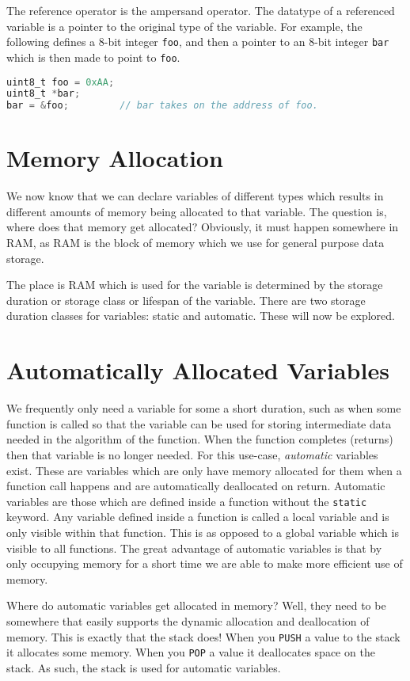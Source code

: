 The reference operator is the ampersand operator. The datatype of a referenced variable is a pointer to the original type of the variable.
For example, the following defines a 8-bit integer \texttt{foo}, and then a pointer to an 8-bit integer \texttt{bar} which is then made to point to \texttt{foo}.

\begin{lstlisting}[language=C]
uint8_t foo = 0xAA;
uint8_t *bar;
bar = &foo;         // bar takes on the address of foo.
\end{lstlisting}

\section{Memory Allocation}
We now know that we can declare variables of different types which results in different amounts of memory being allocated to that variable. 
The question is, where does that memory get allocated?
Obviously, it must happen somewhere in RAM, as RAM is the block of memory which we use for general purpose data storage. 

The place is RAM which is used for the variable is determined by the storage duration or storage class or lifespan of the variable. 
There are two storage duration classes for variables: static and automatic. These will now be explored. 

\section{Automatically Allocated Variables}
We frequently only need a variable for some a short duration, such as when some function is called so that the variable can be used for storing intermediate data needed in the algorithm of the function.
When the function completes (returns) then that variable is no longer needed.
For this use-case, \emph{automatic} variables exist. 
These are variables which are only have memory allocated for them when a function call happens and are automatically deallocated on return. 
Automatic variables are those which are defined inside a function without the \texttt{static} keyword. Any variable defined inside a function is called a local variable and is only visible within that function. This is as opposed to a global variable which is visible to all functions. 
The great advantage of automatic variables is that by only occupying memory for a short time we are able to make more efficient use of memory. 

Where do automatic variables get allocated in memory? Well, they need to be somewhere that easily supports the dynamic allocation and deallocation of memory. This is exactly that the stack does! When you \texttt{PUSH} a value to the stack it allocates some memory. When you \texttt{POP} a value it deallocates space on the stack. As such, the stack is used for automatic variables.

